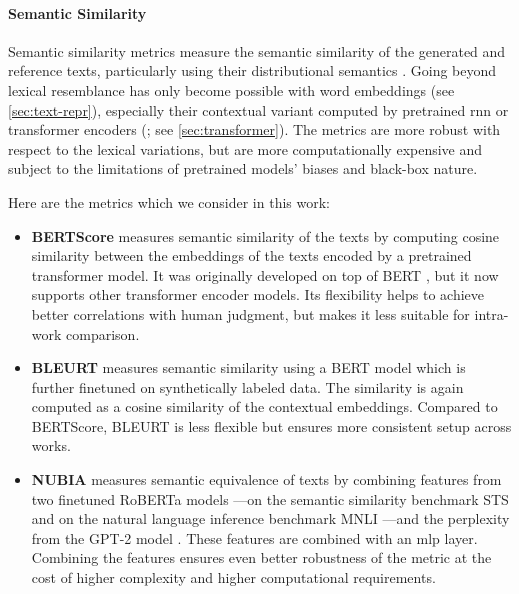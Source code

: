 {\paragraph{Semantic Similarity} Semantic similarity metrics measure the semantic similarity of the generated and reference texts, particularly using their distributional semantics . Going beyond lexical resemblance has only become possible with word embeddings (see \autoref{sec:text-repr}), especially their contextual variant computed by pretrained \ac{rnn} or transformer encoders (\citealp{peters2018deep,devlinBERTPretrainingDeep2019}; see \autoref{sec:transformer}). The metrics are more robust with respect to the lexical variations, but are more computationally expensive and subject to the limitations of pretrained models' biases and black-box nature.

Here are the metrics which we consider in this work:

\begin{itemize}
    \item \textbf{BERTScore} \cite{zhang2019bertscore} measures semantic similarity of the texts by computing cosine similarity between the embeddings of the texts encoded by a pretrained transformer model. It was originally developed on top of BERT \cite{devlinBERTPretrainingDeep2019}, but it now supports other transformer encoder models. Its flexibility helps to achieve better correlations with human judgment, but makes it less suitable for intra-work comparison.
    \item \textbf{BLEURT} \cite{sellam2020bleurt} measures semantic similarity using a BERT model \cite{devlinBERTPretrainingDeep2019} which is further finetuned on synthetically labeled data. The similarity is again computed as a cosine similarity of the contextual embeddings. Compared to BERTScore, BLEURT is less flexible but ensures more consistent setup across works.
    \item \textbf{NUBIA} \cite{kaneNUBIANeUralBased2020} measures semantic equivalence of texts by combining features from two finetuned RoBERTa models \cite{liuRoBERTaRobustlyOptimized2019}---on the semantic similarity benchmark STS \cite{cer-etal-2017-semeval} and on the natural language inference benchmark MNLI \cite{williams2018mnli}---and the perplexity from the GPT-2 model \cite{radford2019language}. These features are combined with an \ac{mlp} layer. Combining the features ensures even better robustness of the metric at the cost of higher complexity and higher computational requirements.
\end{itemize}

}
